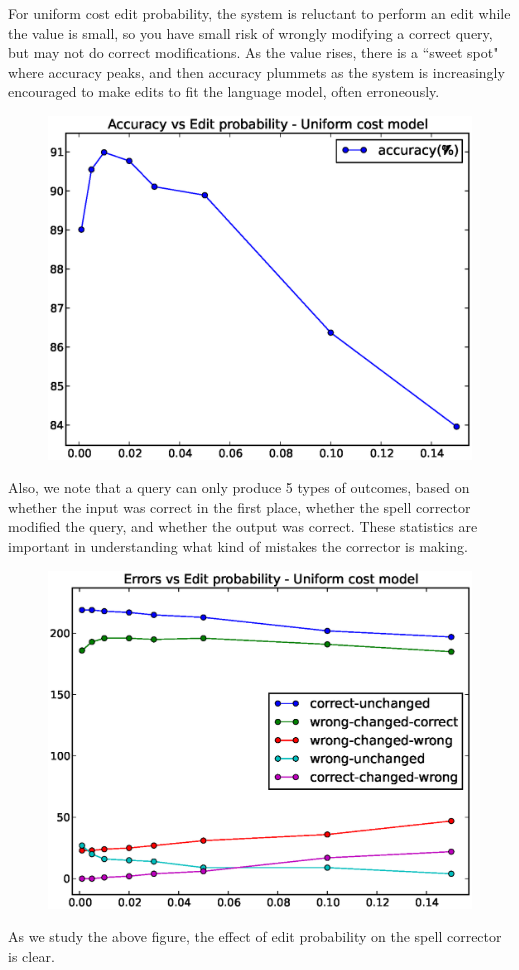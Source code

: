 \documentclass[10pt,twocolumn]{article}
\begin{document}
For uniform cost edit probability, the system is reluctant to perform an edit while the value is small, so you have small risk of wrongly modifying a correct query, but may not do correct modifications. As the value rises, there is a ``sweet spot" where accuracy peaks, and then accuracy plummets as the system is increasingly encouraged to make edits to fit the language model, often erroneously.
\begin{figure}[H]
\includegraphics[width=0.9\linewidth]{editprob}
\end{figure}
Also, we note that a query can only produce 5 types of outcomes, based on whether the input was correct in the first place, whether the spell corrector modified the query, and whether the output was correct. These statistics are important in understanding what kind of mistakes the corrector is making.
\begin{figure}[H]
\includegraphics[width=0.9\linewidth]{editprob_err}
\end{figure}
As we study the above figure, the effect of edit probability on the spell corrector is clear.



\end{document}
